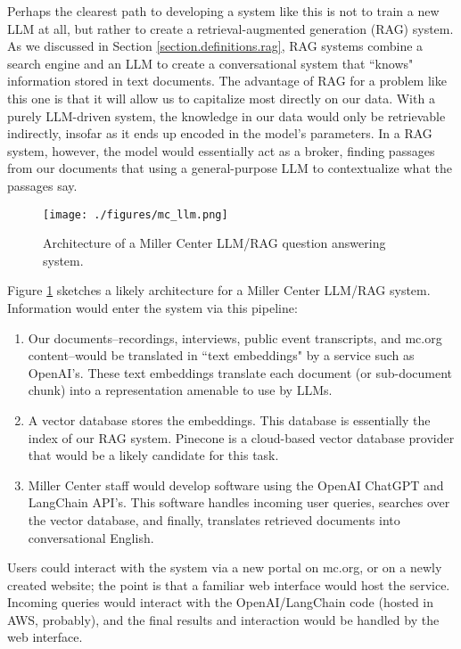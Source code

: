 \documentclass[12pt, oneside]{article}   	%
\begin{document}
Perhaps the clearest path  to developing a system like this is not to train a new LLM at all, but rather to create a retrieval-augmented generation (RAG) system.  As we discussed in Section \ref{section.definitions.rag}, RAG systems combine a search engine and an LLM to create a conversational system that ``knows" information stored in text documents.  The advantage of RAG for a problem like this one is that it will allow us to capitalize most directly on our data.  With a purely LLM-driven system, the knowledge in our data would only be retrievable indirectly, insofar as it ends up encoded in the model's parameters.  In a RAG system, however, the model would essentially act as a broker, finding passages from our documents that using a general-purpose LLM to contextualize what the passages say.


\begin{figure}[htbp]
\begin{center}
\texttt{[image: ./figures/mc\_llm.png]}
\caption{Architecture of a Miller Center LLM/RAG question answering system.}
\label{figure.mcllm}
\end{center}
\end{figure}

Figure \ref{figure.mcllm} sketches a likely architecture for a Miller Center LLM/RAG system.  Information would enter the system via this pipeline:
\begin{enumerate}
\item Our documents--recordings, interviews, public event transcripts, and mc.org content--would be translated in ``text embeddings" by a service such as OpenAI's.  These text embeddings translate each document (or sub-document chunk) into a representation amenable to use by LLMs.
\item A vector database stores the embeddings.  This database is essentially the index of our RAG system.  Pinecone is a cloud-based vector database provider that would be a likely candidate for this task.
\item Miller Center staff would develop software using the OpenAI ChatGPT and LangChain API's.  This software handles incoming user queries, searches over the vector database, and finally, translates retrieved documents into conversational English.
\end{enumerate}
Users could interact with the system via a new portal on mc.org, or on a newly created website; the point is that a familiar web interface would host the service.  Incoming queries would interact with the OpenAI/LangChain code (hosted in AWS, probably), and the final results and interaction would be handled by the web interface.
\end{document}
